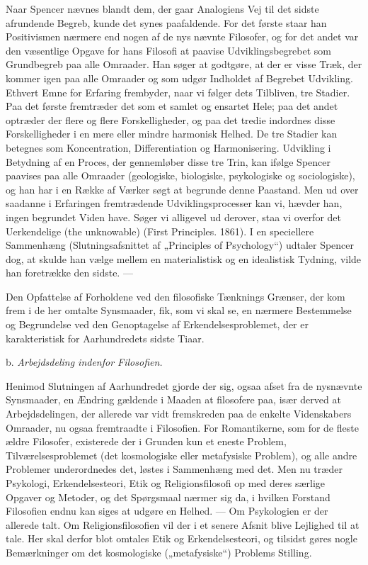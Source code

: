 \documentclass[12pt,a4paper,openany]{book}
\newcommand{\opage}[1]{\marginnote{\footnotesize\textit{[#1]}}}
\newcommand{\sectionhead}[2]{\par\bigskip\phantomsection\begin{center}#1 \textit{#2}\end{center}\addcontentsline{toc}{section}{#1 #2}\medskip\ignorespaces}
\begin{document}
Naar Spencer nævnes blandt dem, der gaar Analogiens Vej til det
sidste afrundende Begreb, kunde det synes paafaldende. For det første
staar han Positivismen nærmere end nogen af de nys nævnte Filosofer,
og for det andet var den væsentlige Opgave for hans Filosofi
at paavise Udviklingsbegrebet som Grundbegreb paa alle Omraader.
Han søger at godtgøre, at der er visse Træk, der kommer igen paa
alle Omraader og som udgør Indholdet af Begrebet Udvikling. Ethvert
Emne for Erfaring frembyder, naar vi følger dets Tilbliven, tre
Stadier. Paa det første fremtræder det som et samlet og ensartet
Hele; paa det andet optræder der flere og flere Forskelligheder,
og paa det tredie indordnes disse Forskelligheder i en mere eller
mindre harmonisk Helhed. De tre Stadier kan betegnes som Koncentration,
Differentiation og Harmonisering. Udvikling i Betydning
af en Proces, der gennemløber disse tre Trin, kan ifølge Spencer
paavises paa alle Omraader (geologiske, biologiske, psykologiske
og sociologiske), og han har i en Række af Værker søgt at begrunde
denne Paastand. Men ud over saadanne i Erfaringen fremtrædende
Udviklingsprocesser kan vi, hævder han, ingen begrundet Viden
have. Søger vi alligevel ud derover, staa vi overfor det Uerkendelige
(the unknowable) (First Principles. 1861). I en speciellere
Sammenhæng (Slutningsafsnittet af „Principles of Psychology“) udtaler
Spencer dog, at skulde han vælge mellem en materialistisk og
en idealistisk Tydning, vilde han foretrække den sidste. ---

\opage{66}Den Opfattelse af Forholdene ved den filosofiske Tænknings
Grænser, der kom frem i de her omtalte Synsmaader, fik, som vi
skal se, en nærmere Bestemmelse og Begrundelse ved den Genoptagelse
af Erkendelsesproblemet, der er karakteristisk for Aarhundredets
sidste Tiaar.

\sectionhead{b.}{Arbejdsdeling indenfor Filosofien.}

Henimod Slutningen af Aarhundredet gjorde der sig, ogsaa afset
fra de nysnævnte Synsmaader, en Ændring gældende i Maaden at
filosofere paa, især derved at Arbejdsdelingen, der allerede var vidt
fremskreden paa de enkelte Videnskabers Omraader, nu ogsaa fremtraadte
i Filosofien. For Romantikerne, som for de fleste ældre Filosofer,
existerede der i Grunden kun et eneste Problem, Tilværelsesproblemet
(det kosmologiske eller metafysiske Problem), og alle
andre Problemer underordnedes det, løstes i Sammenhæng med det.
Men nu træder Psykologi, Erkendelsesteori, Etik og Religionsfilosofi
op med deres særlige Opgaver og Metoder, og det Spørgsmaal nærmer
sig da, i hvilken Forstand Filosofien endnu kan siges at udgøre
en Helhed. --- Om Psykologien er der allerede talt. Om Religionsfilosofien
vil der i et senere Afsnit blive Lejlighed til at tale. Her skal
derfor blot omtales Etik og Erkendelsesteori, og tilsidst gøres nogle
Bemærkninger om det kosmologiske („metafysiske“) Problems Stilling.
\end{document}
